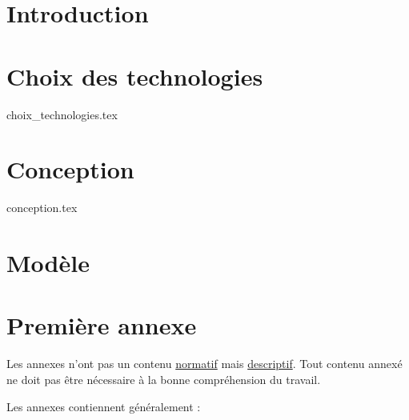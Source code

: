 \documentclass[
    reds, %
    il, %
]{heig-tb}
\let\cleardoublepage=\clearpage
\begin{document}
\maketitle
\frontmatter

\preamble
\authentification

%    
\clearemptydoublepage
{
    \tableofcontents
    \let\cleardoublepage\clearpage
    \listoffigures
    \let\cleardoublepage\clearpage
    \listoftables
    \let\cleardoublepage\clearpage
    \listoflistings
}
\printnomenclature
\clearemptydoublepage
{}

\mainmatter

\chapter{Introduction}



\chapter{Choix des technologies}
 {choix_technologies.tex}

\chapter{Conception}
 {conception.tex}

\chapter{Modèle}


\clearpage
\printbibliography

\appendix
\appendixpage
\addappheadtotoc

\chapter{Première annexe}

Les annexes n'ont pas un contenu \underline{normatif} mais \underline{descriptif}. Tout contenu annexé ne doit pas être nécessaire à la bonne compréhension du travail.

Les annexes contiennent généralement :
\end{document}
